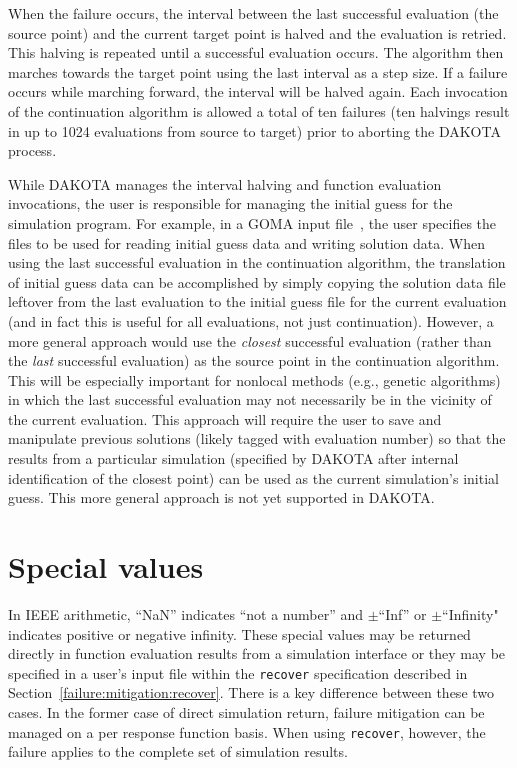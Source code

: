 When the failure occurs, the interval between the last successful
evaluation (the source point) and the current target point is halved
and the evaluation is retried. This halving is repeated until a
successful evaluation occurs. The algorithm then marches towards the
target point using the last interval as a step size. If a failure
occurs while marching forward, the interval will be halved again. Each
invocation of the continuation algorithm is allowed a total of ten
failures (ten halvings result in up to 1024 evaluations from source to
target) prior to aborting the DAKOTA process.

While DAKOTA manages the interval halving and function evaluation
invocations, the user is responsible for managing the initial guess
for the simulation program. For example, in a GOMA input
file~\cite{Sch95}, the user specifies the files to be used for reading
initial guess data and writing solution data. When using the last
successful evaluation in the continuation algorithm, the translation
of initial guess data can be accomplished by simply copying the
solution data file leftover from the last evaluation to the initial
guess file for the current evaluation (and in fact this is useful for
all evaluations, not just continuation). However, a more general
approach would use the \emph{closest} successful evaluation (rather
than the \emph{last} successful evaluation) as the source point in the
continuation algorithm. This will be especially important for nonlocal
methods (e.g., genetic algorithms) in which the last successful
evaluation may not necessarily be in the vicinity of the current
evaluation. This approach will require the user to save and manipulate
previous solutions (likely tagged with evaluation number) so that the
results from a particular simulation (specified by DAKOTA after
internal identification of the closest point) can be used as the
current simulation's initial guess.  This more general approach is not
yet supported in DAKOTA.

\section{Special values} \label{failure:special}

In IEEE arithmetic, ``NaN'' indicates ``not a number'' and
$\pm$``Inf'' or $\pm$``Infinity" indicates positive or negative
infinity.  These special values may be returned directly in function
evaluation results from a simulation interface or they may be
specified in a user's input file within the \texttt{recover}
specification described in Section~\ref{failure:mitigation:recover}.
There is a key difference between these two cases.  In the former case
of direct simulation return, failure mitigation can be managed on a
per response function basis.  When using \texttt{recover}, however,
the failure applies to the complete set of simulation results.

